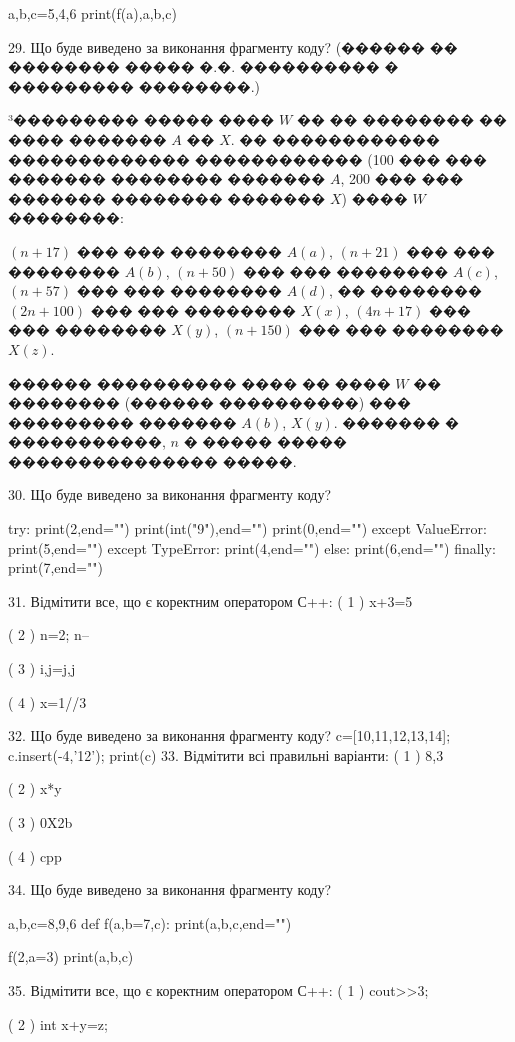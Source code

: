 \documentclass[11pt]{article}
\begin{document}
a,b,c=5,4,6
print(f(a),a,b,c)

29. Що буде виведено за виконання фрагменту коду?
(������ �� �������� ����� �.�. ���������� � ��������� ��������.)\par {\hspace {0.5 cm}}³��������� ����� ���� $W$ �� �� �������� �� ���� ������� $A$ �� $X$. �� ������������ ������������� ������������ (100 ��� ��� ������� �������� ������� $A$,  200 ��� ��� ������� �������� ������� $X$) ���� $W$ ��������:\par {\hspace {0.5 cm}}$(n+17)$ ��� ��� �������� $A(a)$, $(n+21)$ ��� ��� �������� $A(b)$, $(n+50)$ ��� ��� �������� $A(c)$, $(n+57)$ ��� ��� �������� $A(d)$, �� �������� $(2n+100)$ ��� ��� �������� $X(x)$, $(4n+17)$ ��� ��� �������� $X(y)$, $(n+150)$ ��� ��� �������� $X(z)$.\par
{\hspace {0.5 cm}}������ ���������� ���� �� ���� $W$ �� �������� (������ ����������) ��� ��������� ������� $A(b)$, $X(y)$. ������� � �����������, $n$ � ����� ����� ��������������� �����.\par
30. Що буде виведено за виконання фрагменту коду?

try:
    print(2,end="")
    print(int("9"),end="")
    print(0,end="")
except ValueError: print(5,end="")
except TypeError: print(4,end="")
else: print(6,end="")
finally: print(7,end="")


31. Відмітити все, що є коректним оператором С++:
( 1 ) x+3=5

( 2 ) n=2; n--

( 3 ) i,j=j,j

( 4 ) x=1//3

32. Що буде виведено за виконання фрагменту коду?
c=[10,11,12,13,14]; c.insert(-4,'12'); print(c)
33. Відмітити всі правильні варіанти:
( 1 ) 8,3

( 2 ) x*y

( 3 ) 0X2b

( 4 ) cpp

34. Що буде виведено за виконання фрагменту коду?

a,b,c=8,9,6
def f(a,b=7,c):
    print(a,b,c,end="")

f(2,a=3)
print(a,b,c)


35. Відмітити все, що є коректним оператором С++:
( 1 ) cout>>3;

( 2 ) int x+y=z;
\end{document}
